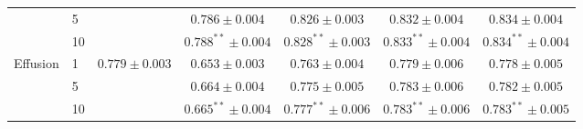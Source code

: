 \begin{table}[htbp]
\begin{tabular}{llccccc}
 & 5 &  & $0.786 \pm 0.004$ & $0.826 \pm 0.003$ & $0.832 \pm 0.004$ & $\mathbf{0.834} \pm 0.004$ \\
 & 10 &  & $0.788^{**} \pm 0.004$ & $0.828^{**} \pm 0.003$ & $0.833^{**} \pm 0.004$ & $\mathbf{0.834}^{**} \pm 0.004$ \\
\midrule
\multirow{3}{*}{Effusion} & 1 & \multirow{3}{*}{$0.779 \pm 0.003$} & $0.653 \pm 0.003$ & $0.763 \pm 0.004$ & $\mathbf{0.779} \pm 0.006$ & $0.778 \pm 0.005$ \\
 & 5 &  & $0.664 \pm 0.004$ & $0.775 \pm 0.005$ & $\mathbf{0.783} \pm 0.006$ & $0.782 \pm 0.005$ \\
 & 10 &  & $0.665^{**} \pm 0.004$ & $0.777^{**} \pm 0.006$ & $\mathbf{0.783}^{**} \pm 0.006$ & $0.783^{**} \pm 0.005$ \\
\bottomrule
\end{tabular}
\end{table}
